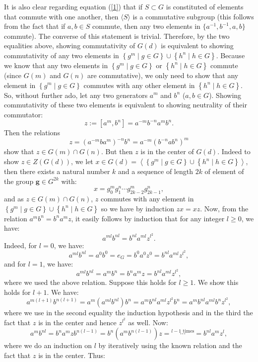 \documentclass[11pt, a4paper, oneside]{article}
\theoremstyle{remark}
\theoremstyle{lemma}
\begin{document}
It is also clear regarding equation (\ref{1}) that if $S\subset G$ is constituted of elements that commute with one another, then $\langle S\rangle$ is a commutative subgroup (this follows from the fact that if $a,b\in S$ commute, then any two elements in $\{a^{-1},b^{-1},a,b\}$ commute). The converse of this statement is trivial. Therefore, by the two equalities above, showing commutativity of $G(d)$ is equivalent to showing commutativity of any two elements in $\left\{g^m \mid g\in G\right\}\cup\left\{h^n \mid h\in G\right\}$. Because we know that any two elements in $\left\{g^m \mid g\in G\right\}$ or $\left\{h^n \mid h\in G\right\}$ commute (since $G(m)$ and $G(n)$ are commutative), we only need to show that any element in $\left\{g^m \mid g\in G\right\}$ commutes with any other element in $\left\{h^n \mid h\in G\right\}$. So, without further ado, let any two generators \( a^m \) and \( b^n \) ($a,b\in G$). Showing commutativity of these two elements is equivalent to showing neutrality of their commutator:
\[
z:= [a^m,b^n] = a^{-m}b^{-n} a^m b^n.
\]
Then the relations
\[
z = \left(a^{-m} b a^m\right)^{-n} b^n = a^{-m} \left(b^{-n} a b^n\right)^m
\]
show that \( z \in G(m) \cap G(n) \). But then \( z \) is in the center of \( G(d) \). Indeed to show $z\in Z(G(d))$, we let $x\in G(d)=\left\langle\left\{g^m \mid g\in G\right\}\cup\left\{h^n \mid h\in G\right\}\right\rangle$, then there exists a natural number $k$ and a sequence of length $2k$ of element of the group $\textbf{g}\in G^{2k}$ with:
\[
x=g_0^m g_1^n \cdots g_{2k-2}^m g_{2k-1}^n,
\]
and as $z\in G(m) \cap G(n)$, $z$ commutes with any element in $\left\{g^m \mid g\in G\right\}\cup\left\{h^n \mid h\in G\right\}$ so we have by induction $zx=xz$. Now, from the relation \( a^m b^n = b^n a^m z \), it easily follows by induction that for any integer $l\geq 0$, we have:
\[
a^{ml} b^{nl}=b^{nl} a^{ml} z^{l^2}.
\]
Indeed, for $l=0$, we have:
\[
a^{ml} b^{nl}=a^{0} b^{0}=e_G=b^{0} a^{0} z^0=b^{nl} a^{ml} z^{l^2},
\]
and for $l=1$, we have:
\[
a^{ml} b^{nl}=a^{m} b^{n}=b^n a^m z=b^{nl} a^{ml} z^{l^2},
\]
where we used the above relation. Suppose this holds for $l\geq 1$. We show this holds for $l+1$. We have:
\[
a^{m(l+1)} b^{n(l+1)}=a^m \left(a^{ml}b^{nl}\right)b^n=a^m b^{nl} a^{ml} z^{l^2} b^n=a^m b^{nl} a^{ml} b^n z^{l^2},
\]
where we use in the second equality the induction hypothesis and in the third the fact that $z$ is in the center and hence $z^{l^2}$ as well. Now:
\[
a^m b^{nl}=b^n a^m z b^{n(l-1)}=b^n \left(a^m b^{n(l-1)}\right) z=\overset{l-1\text{ times}}{\cdots}=b^{nl} a^{m} z^{l},
\]
where we do an induction on $l$ by iteratively using the known relation and the fact that $z$ is in the center. Thus:
\end{document}
